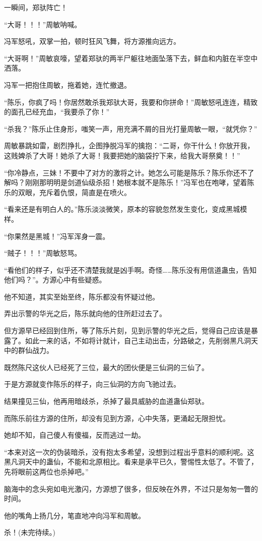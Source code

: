 \begin{this_body}
一瞬间，郑驮阵亡！

“大哥！！！”周敏呐喊。

冯军怒吼，双掌一拍，顿时狂风飞舞，将方源推向远方。

“大哥啊！”周敏哀嚎，望着郑驮的两半尸躯往地面坠落下去，鲜血和内脏在半空中洒落。

冯军一把抱住周敏，拖着她，连忙撤退。

“陈乐，你疯了吗！你居然敢杀我郑驮大哥，我要和你拼命！”周敏怒吼连连，精致的面孔已经充血，“我要杀了你！”

“杀我？”陈乐止住身形，嗤笑一声，用充满不屑的目光打量周敏一眼，“就凭你？”

周敏暴跳如雷，剧烈挣扎，企图挣脱冯军的擒抱：“二哥，你干什么！你放开我，这贱婢杀了大哥！她杀了大哥！我要把她的脑袋拧下来，给我大哥祭奠！！”

“你冷静点，三妹！不要中了对方的激将之计。她怎么可能是陈乐？陈乐你还不了解吗？刚刚那明明是剑道仙级杀招！她根本就不是陈乐！”冯军也在咆哮，望着陈乐的双眼，充斥着仇恨，简直是在喷火。

“看来还是有明白人的。”陈乐淡淡微笑，原本的容貌忽然发生变化，变成黑城模样。

“你果然是黑城！”冯军浑身一震。

“贼子！！！”周敏怒骂。

“看他们的样子，似乎还不清楚我就是凶手啊。奇怪……陈乐没有用信道蛊虫，告知他们吗？”。方源心中有些疑惑。

他不知道，其实至始至终，陈乐都没有怀疑过他。

弄出示警的华光之后，陈乐就向他的住所赶过去了。

但方源早已经回到住所，等了陈乐片刻，见到示警的华光之后，觉得自己应该是暴露了。如此一来的话，不如将计就计，自己主动出击，分路破之，先削弱黑凡洞天中的群仙战力。

既然陈尺这伙人已经死了三位，最大的团伙便是三仙洞的三仙了。

于是方源就变作陈乐的样子，向三仙洞的方向飞驰过去。

结果撞见三仙，他再用暗歧杀，杀掉了最具威胁的血道蛊仙郑驮。

而陈乐前往方源的住所，却没有见到方源，心中失落，更涌起无限担忧。

她却不知，自己傻人有傻福，反而逃过一劫。

“本来对这一次的伪装暗杀，没有抱太多希望，没想到过程出乎意料的顺利呢。这黑凡洞天中的蛊仙，不能和北原相比。看来是承平已久，警惕性太低了。不管了，先将眼前这两位也杀掉吧。”

脑海中的念头宛如电光激闪，方源想了很多，但反映在外界，不过只是匆匆一瞥的时间。

他的嘴角上扬几分，笔直地冲向冯军和周敏。

杀！(未完待续。)

\end{this_body}


